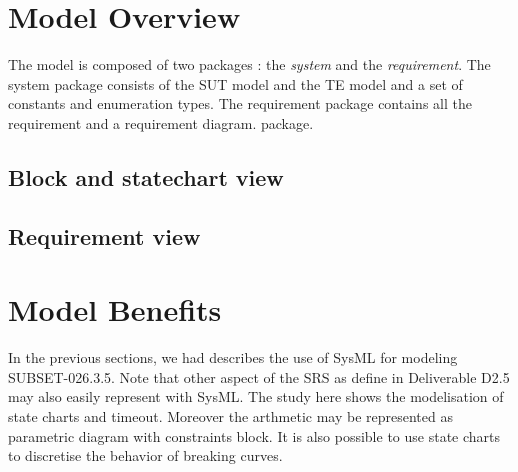 \documentclass{template/openetcs_article}
\begin{document}
\section{Model Overview}
\label{sec:model-overview}
The model is composed of two packages : the \emph{system} and the
\emph{requirement}. The system package consists of the SUT model and the TE
model and a set of constants and enumeration types. The
requirement package contains all the requirement and a requirement diagram.
package.

  \subsection{Block and statechart view}
  

  \subsection{Requirement view}
  

\section{Model Benefits}
\label{sec:model-highlights}

In the previous sections, we had describes the use of SysML for modeling
SUBSET-026.3.5. Note that other aspect of the SRS as define in Deliverable D2.5
may also easily represent with SysML. The study here shows the 
modelisation of state charts and timeout. Moreover the arthmetic may be
represented as parametric diagram with constraints block. It is also possible to
use state charts to discretise the behavior of breaking curves.
\end{document}
